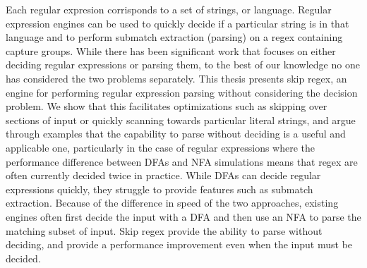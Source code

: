 \begin{thesisabstract}

Each regular expresion corrisponds to a set of strings, or
language. Regular expression engines can be used to quickly decide
if a particular string is in that language and to
perform submatch extraction (parsing) on a regex containing
capture groups. While there has been significant work that focuses on either
deciding regular expressions or parsing them, to
the best of our knowledge no one has considered the
two problems separately. This thesis presents skip
regex, an engine for performing regular expression
parsing without considering the decision problem.
We show that this facilitates optimizations such as skipping
over sections of input or quickly scanning towards particular
literal strings, and argue through examples that the capability to parse
without deciding is a useful and applicable one, particularly
in the case of regular expressions where the performance
difference between DFAs and NFA simulations means that regex are
often currently decided twice in practice. While DFAs can decide
regular expressions quickly, they struggle to provide features
such as submatch extraction. Because of the difference in speed
of the two approaches, existing engines often first decide the input
with a DFA and then use an NFA to parse the matching subset of input.
Skip regex provide the ability to parse without deciding,
and provide a performance improvement even when the input must
be decided.

\nopagebreak
\end{thesisabstract}
